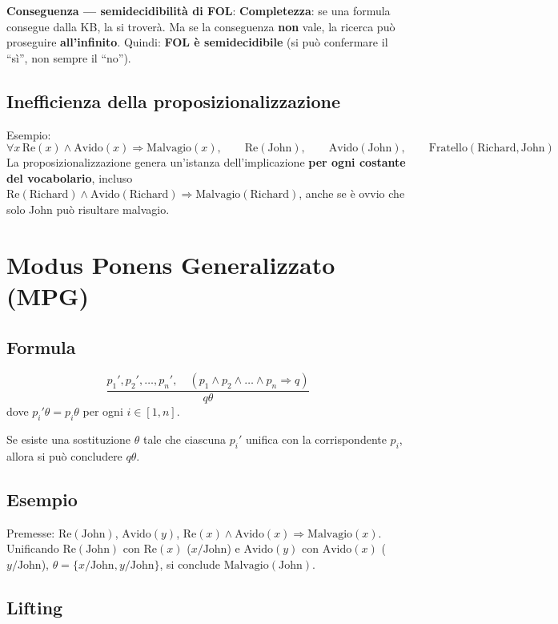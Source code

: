 \documentclass[11pt,a4paper]{report}
\begin{document}
\textbf{Conseguenza --- semidecidibilità di FOL}: \textbf{Completezza}: se una formula consegue dalla KB, la si troverà. Ma se la conseguenza \textbf{non} vale, la ricerca può proseguire \textbf{all'infinito}. Quindi: \textbf{FOL è semidecidibile} (si può confermare il ``sì'', non sempre il ``no'').

\subsection*{Inefficienza della proposizionalizzazione}

Esempio:
\[
\forall x\, \text{Re}(x)\wedge\text{Avido}(x) \Rightarrow \text{Malvagio}(x), \qquad \text{Re}(\text{John}), \qquad \text{Avido}(\text{John}), \qquad \text{Fratello}(\text{Richard},\text{John})
\]
La proposizionalizzazione genera un'istanza dell'implicazione \textbf{per ogni costante del vocabolario}, incluso $\text{Re}(\text{Richard})\wedge\text{Avido}(\text{Richard})\Rightarrow\text{Malvagio}(\text{Richard})$, anche se è ovvio che solo John può risultare malvagio.

\section{Modus Ponens Generalizzato (MPG)}

\subsection*{Formula}

\[
\frac{p_1', p_2', \dots, p_n', \quad (p_1\wedge p_2\wedge\dots\wedge p_n \Rightarrow q)}{q\theta}
\]
dove $p_i'\theta = p_i\theta$ per ogni $i \in [1,n]$.

Se esiste una sostituzione $\theta$ tale che ciascuna $p_i'$ unifica con la corrispondente $p_i$, allora si può concludere $q\theta$.

\subsection*{Esempio}

Premesse: $\text{Re}(\text{John})$, $\text{Avido}(y)$, $\text{Re}(x)\wedge\text{Avido}(x)\Rightarrow\text{Malvagio}(x)$. Unificando $\text{Re}(\text{John})$ con $\text{Re}(x)$ ($x/\text{John}$) e $\text{Avido}(y)$ con $\text{Avido}(x)$ ($y/\text{John}$), $\theta=\{x/\text{John},y/\text{John}\}$, si conclude $\text{Malvagio}(\text{John})$.

\subsection*{Lifting}
\end{document}
